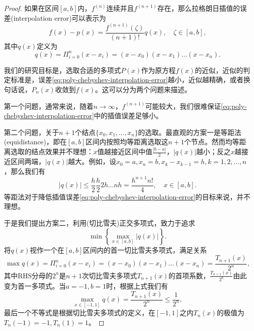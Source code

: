 \begin{subappendices}
\begin{proof}
如果在区间$[a,b]$内，$f^{(n)}$连续并且$f^{(n+1)}$存在，那么拉格朗日插值的误差(interpolation error)可以表示为
\begin{equation}
  \label{eq:poly-chebyshev-interpolation-error}
  f(x) - p(x) = \frac{f^{(n+1)}(\zeta)}{(n+1)!} q(x), \quad \zeta \in [a,b],
\end{equation}
其中$q(x)$定义为
\begin{equation*}
  \label{eq:poly-chebyshev-interpolation-error-q}
  q(x) = \Pi_{i=0}^{n} \left( x - x_i \right) = \left( x - x_0 \right) \left( x - x_1 \right) \ldots \left( x - x_n \right).
\end{equation*}

我们的研究目标是，选取合适的多项式$P(x)$作为原方程$f(x)$的近似，近似的判定标准是，误差\eqref{eq:poly-chebyshev-interpolation-error}越小，近似越精确，或者换句话说，$P_n(x)$收敛到$f(x)$。这可以分为两个问题来描述。

第一个问题，通常来说，随着$n \rightarrow \infty$，$f^{(n+1)}$可能较大，我们很难保证\eqref{eq:poly-chebyshev-interpolation-error}中的插值误差足够小。

第二个问题，关于$n+1$个结点$\{ x_0, x_1, \ldots, x_n \}$的选取。最直观的方案一是等距法(equidistance)，即在$[a,b]$区间内按照均等距离选取这$n+1$个节点。然而均等距离选取的结点效果并不理想：$x$值越接近区间中值$\frac{|b-a|}{2}$，$|q(x)|$越小；反之$x$越接近区间两端，$|q(x)|$越大。例如，设$x_0=a, x_n=b, x_k-x_{k-1} = h, k=1,2,\ldots,n$，那么我们有
\begin{equation*}
  \left| q(x) \right| \le \frac{h}{2} \frac{h}{2} 2h \ldots nh = \frac{h^{n+1} n!}{4}, \quad x \in [a,b].
\end{equation*}
等距法对于降低插值误差\eqref{eq:poly-chebyshev-interpolation-error}的目标来说，并不理想。

于是我们提出方案二，利用(切比雪夫)正交多项式，致力于追求
\begin{equation*}
  \min \left\{ \max_{x \in [a,b]} \left| q(x) \right| \right\}.
\end{equation*}
将$q(x)$视作一个在$[a,b]$区间内的首一切比雪夫多项式，满足关系
\begin{equation*}
  \max q(x) = \Pi_{i=0}^{n} \left( x - x_i \right) = \left( x - x_0 \right) \left( x - x_1 \right) \ldots \left( x - x_n \right) = \frac{T_{n+1}(x)}{2^{n}},
\end{equation*}
其中RHS分母的$2^{n}$是$n+1$次切比雪夫多项式$T_{n+1}(x)$的首项系数，$\frac{T_{n+1}(x)}{2^{n}}$由此变为首一多项式。当$a=-1,b=1$时，根据上式我们有
\begin{equation*}
  \max_{x \in [-1,1]} q(x) =  \frac{T_{n+1}(x)}{2^{n}} \le \frac{1}{2^n},
\end{equation*}
最后一个不等式是根据切比雪夫多项式的定义，在$[-1,1]$之内$T_n(x)$的极值为$T_{n}(-1)=-1,T_{n}(1)=1$。


\end{proof}
\end{subappendices}
